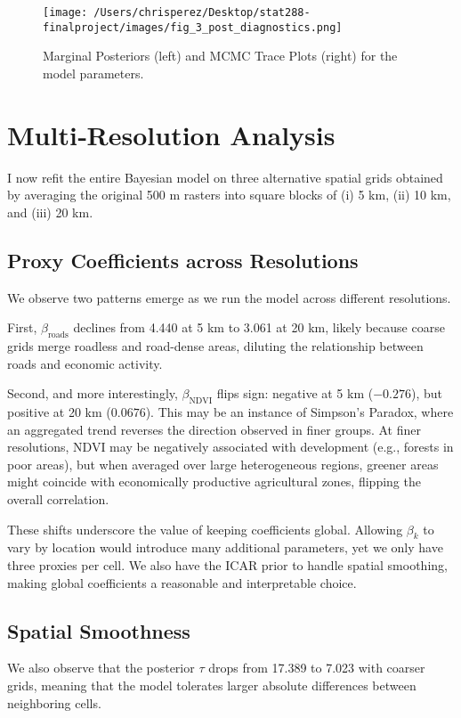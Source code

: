 \documentclass[12pt]{article}
\begin{document}
\begin{figure}[H]
  \centering
  \texttt{[image: /Users/chrisperez/Desktop/stat288-finalproject/images/fig\_3\_post\_diagnostics.png]}
  \caption{Marginal Posteriors (left) and MCMC Trace Plots (right) for the model parameters.}
  \label{fig:marginal_posterior_plot} 
\end{figure}


\section{Multi‑Resolution Analysis}
\label{sec:multires}

I now refit the entire Bayesian model on three alternative spatial grids obtained by averaging the original 500 m rasters into square blocks of (i) 5 km, (ii) 10 km, and (iii) 20 km.


\subsection{Proxy Coefficients across Resolutions}
We observe two patterns emerge as we run the model across different resolutions.

First, $\beta_{\text{roads}}$ declines from 4.440 at 5 km to 3.061 at 20 km, likely because coarse grids merge roadless and road-dense areas, diluting the relationship between roads and economic activity.

Second, and more interestingly, $\beta_{\text{NDVI}}$ flips sign: negative at 5 km ($-0.276$), but positive at 20 km ($0.0676$). This may be an instance of Simpson's Paradox, where an aggregated trend reverses the direction observed in finer groups. At finer resolutions, NDVI may be negatively associated with development (e.g., forests in poor areas), but when averaged over large heterogeneous regions, greener areas might coincide with economically productive agricultural zones, flipping the overall correlation.

These shifts underscore the value of keeping coefficients global. Allowing $\beta_k$ to vary by location would introduce many additional parameters, yet we only have three proxies per cell. We also have the ICAR prior to handle spatial smoothing, making global coefficients a reasonable and interpretable choice.

\subsection{Spatial Smoothness}
We also observe that the posterior $\tau$ drops from 17.389 to 7.023 with coarser grids, meaning that the model tolerates larger absolute differences between neighboring cells. 
\end{document}
